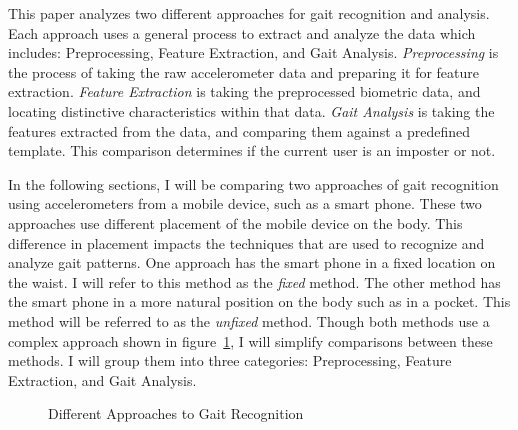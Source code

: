 \documentclass{sig-alternate}
\begin{document}
	This paper analyzes two different approaches for gait recognition and analysis. Each approach uses a general process to extract and analyze the data which includes: Preprocessing, Feature Extraction, and Gait Analysis. \textit{Preprocessing} is the process of taking the raw accelerometer data and preparing it for feature extraction. \textit{Feature Extraction} is taking the preprocessed biometric data, and locating distinctive characteristics within that data. \textit{Gait Analysis} is taking the features extracted from the data, and comparing them against a predefined template. This comparison determines if the current user is an imposter or not.

	In the following sections, I will be comparing two approaches of gait recognition using accelerometers from a mobile device, such as a smart phone. These two approaches use different placement of the mobile device on the body. This difference in placement impacts the techniques that are used to recognize and analyze gait patterns. One approach has the smart phone in a fixed location on the waist. I will refer to this method as the \textit{fixed} method. The other method has the smart phone in a more natural position on the body such as in a pocket. This method will be referred to as the \textit{unfixed} method. Though both methods use a complex approach shown in figure~\ref{fig:AlgorithmProcess}, I will simplify comparisons between these methods. I will group them into three categories: Preprocessing, Feature Extraction, and Gait Analysis. 
	
\begin{figure}
\centering
{}
\caption{Different Approaches to Gait Recognition}
\label{fig:AlgorithmProcess}
\end{figure}	



\end{document}

